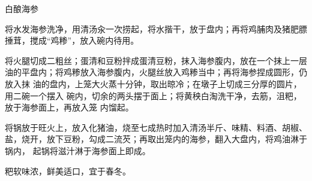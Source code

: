 \begin{recipe}[金钱海参]{白酿海参}

\ingredients


\cooking

\step 将水发海参洗净，用清汤汆一次捞起，将水揩干，放于盘内；再将鸡脯肉及猪肥膘
捶茸，搅成“鸡糁”，放入碗内待用。

\step 将火腿切成二粗丝；蛋清和豆粉拌成蛋清豆粉，抹入海参腹内，放在一个抹上一层
油的平盘内；将鸡糁放入海参腹内，火腿丝放入鸡糁当中；再将海参捏成圆形，仍放入抹
油的盘内，上笼大火蒸十分钟，取出晾冷；在墩子上切成三分厚的圆片，用二碗一个摆入
碗内，切余的两头摆于面上；将黄秧白淘洗干净，去筋，沮粑，放于海参面上，再放入笼
内馏起。

\step 将锅放于旺火上，放入化猪油，烧至七成热时加入清汤半斤、味精、料酒、胡椒、
盐，烧开，放下豆粉，勾成二流芡；再取出笼内的海参，翻入大盘内，将鸡油淋于锅内，
起锅将滋汁淋于海参面上即成。

\features

粑软味浓，鲜美适口，宜于春冬。

\end{recipe}

